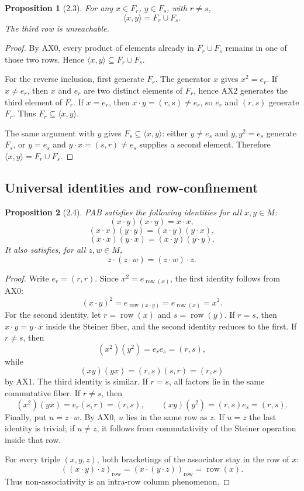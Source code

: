 \documentclass[11pt]{article}
\newtheorem*{propositionstar}{Proposition}
\begin{document}
\begin{propositionstar}[2.3]
For any \(x\in F_r\), \(y\in F_s\), with \(r\ne s\),
\[
\langle x,y\rangle=F_r\cup F_s.
\]
The third row is unreachable.

\end{propositionstar}
\begin{proof}
By AX0, every product of elements already in \(F_r\cup F_s\) remains in
one of those two rows. Hence \(\langle x,y\rangle\subseteq F_r\cup F_s\).

For the reverse inclusion, first generate \(F_r\). The generator \(x\) gives
\(x^2=e_r\). If \(x\ne e_r\), then \(x\) and \(e_r\) are two distinct elements of
\(F_r\), hence AX2 generates the third element of \(F_r\). If \(x=e_r\), then
\(x\cdot y=(r,s)\ne e_r\), so \(e_r\) and \((r,s)\) generate \(F_r\). Thus
\(F_r\subseteq\langle x,y\rangle\).

The same argument with \(y\) gives \(F_s\subseteq\langle x,y\rangle\): either
\(y\ne e_s\) and \(y,y^2=e_s\) generate \(F_s\), or \(y=e_s\) and
\(y\cdot x=(s,r)\ne e_s\) supplies a second element. Therefore
\(\langle x,y\rangle=F_r\cup F_s\).

\end{proof}
\subsection{Universal identities and row-confinement}

\begin{propositionstar}[2.4]
PAB satisfies the following identities for all \(x,y\in M\):
\[
(x\cdot y)(x\cdot y)=x\cdot x,
\]
\[
(x\cdot x)(y\cdot y)=(x\cdot y)(y\cdot x),
\]
\[
(x\cdot x)(y\cdot x)=(x\cdot y)(y\cdot y).
\]
It also satisfies, for all \(z,w\in M\),
\[
z\cdot(z\cdot w)=(z\cdot w)\cdot z.
\]

\end{propositionstar}
\begin{proof}
Write \(e_r=(r,r)\). Since \(x^2=e_{\operatorname{row}(x)}\), the first
identity follows from AX0:
\[
(x\cdot y)^2=e_{\operatorname{row}(x\cdot y)}=e_{\operatorname{row}(x)}=x^2.
\]
For the second identity, let \(r=\operatorname{row}(x)\) and
\(s=\operatorname{row}(y)\). If \(r=s\), then \(x\cdot y=y\cdot x\) inside the
Steiner fiber, and the second identity reduces to the first. If \(r\ne s\), then
\[
(x^2)(y^2)=e_r e_s=(r,s),
\]
while
\[
(xy)(yx)=(r,s)(s,r)=(r,s)
\]
by AX1. The third identity is similar. If \(r=s\), all factors lie in the same
commutative fiber. If \(r\ne s\), then
\[
(x^2)(yx)=e_r(s,r)=(r,s),
\qquad
(xy)(y^2)=(r,s)e_s=(r,s).
\]
Finally, put \(u=z\cdot w\). By AX0, \(u\) lies in the same row as \(z\). If
\(u=z\) the last identity is trivial; if \(u\ne z\), it follows from commutativity
of the Steiner operation inside that row.

For every triple \((x,y,z)\), both bracketings of the associator stay in the row
of \(x\):
\[
((x\cdot y)\cdot z)_{\mathrm{row}}=(x\cdot(y\cdot z))_{\mathrm{row}}=
\operatorname{row}(x).
\]
Thus non-associativity is an intra-row column phenomenon.

\end{proof}
\end{document}
